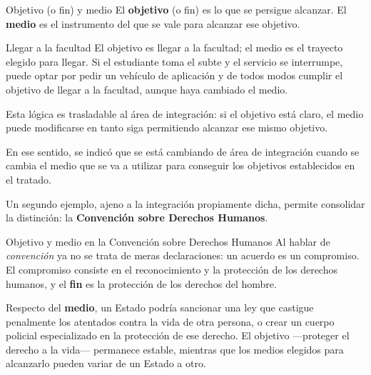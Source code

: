 \documentclass[12pt,oneside]{book}
\begin{document}
\begin{definition}{Objetivo (o fin) y medio}
El \textbf{objetivo} (o fin) es lo que se persigue alcanzar. El \textbf{medio} es el instrumento del que se vale para alcanzar ese objetivo.
\end{definition}

\begin{example}{Llegar a la facultad}
El objetivo es llegar a la facultad; el medio es el trayecto elegido para llegar. Si el estudiante toma el subte y el servicio se interrumpe, puede optar por pedir un vehículo de aplicación y de todos modos cumplir el objetivo de llegar a la facultad, aunque haya cambiado el medio.

Esta lógica es trasladable al área de integración: si el objetivo está claro, el medio puede modificarse en tanto siga permitiendo alcanzar ese mismo objetivo.
\end{example}

En ese sentido, se indicó que se está cambiando de área de integración cuando se cambia el medio que se va a utilizar para conseguir los objetivos establecidos en el tratado.

Un segundo ejemplo, ajeno a la integración propiamente dicha, permite consolidar la distinción: la \textbf{Convención sobre Derechos Humanos}.

\begin{example}{Objetivo y medio en la Convención sobre Derechos Humanos}
Al hablar de \emph{convención} ya no se trata de meras declaraciones: un acuerdo es un compromiso. El compromiso consiste en el reconocimiento y la protección de los derechos humanos, y el \textbf{fin} es la protección de los derechos del hombre.

Respecto del \textbf{medio}, un Estado podría sancionar una ley que castigue penalmente los atentados contra la vida de otra persona, o crear un cuerpo policial especializado en la protección de ese derecho. El objetivo —proteger el derecho a la vida— permanece estable, mientras que los medios elegidos para alcanzarlo pueden variar de un Estado a otro.
\end{example}
\end{document}
